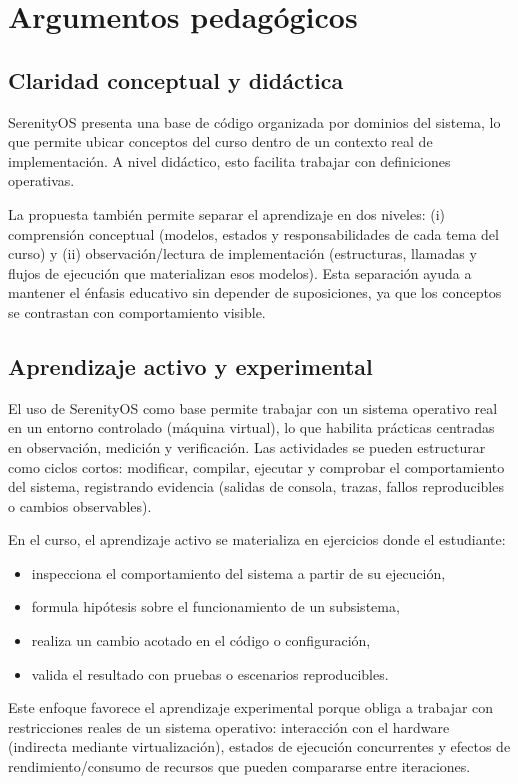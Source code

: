\section{Argumentos pedagógicos}
\subsection{Claridad conceptual y didáctica}
SerenityOS presenta una base de código organizada por dominios del sistema, lo que permite ubicar conceptos del curso dentro de un contexto real de implementación. A nivel didáctico, esto facilita trabajar con definiciones operativas.

La propuesta también permite separar el aprendizaje en dos niveles: (i) comprensión conceptual (modelos, estados y responsabilidades de cada tema del curso) y (ii) observación/lectura de implementación (estructuras, llamadas y flujos de ejecución que materializan esos modelos). Esta separación ayuda a mantener el énfasis educativo sin depender de suposiciones, ya que los conceptos se contrastan con comportamiento visible.
\subsection{Aprendizaje activo y experimental}
El uso de SerenityOS como base permite trabajar con un sistema operativo real en un entorno controlado (máquina virtual), lo que habilita prácticas centradas en observación, medición y verificación. Las actividades se pueden estructurar como ciclos cortos: modificar, compilar, ejecutar y comprobar el comportamiento del sistema, registrando evidencia (salidas de consola, trazas, fallos reproducibles o cambios observables).

En el curso, el aprendizaje activo se materializa en ejercicios donde el estudiante:
\begin{itemize}
	\item inspecciona el comportamiento del sistema a partir de su ejecución,
	\item formula hipótesis sobre el funcionamiento de un subsistema,
	\item realiza un cambio acotado en el código o configuración,
	\item valida el resultado con pruebas o escenarios reproducibles.
\end{itemize}

Este enfoque favorece el aprendizaje experimental porque obliga a trabajar con restricciones reales de un sistema operativo: interacción con el hardware (indirecta mediante virtualización), estados de ejecución concurrentes y efectos de rendimiento/consumo de recursos que pueden compararse entre iteraciones.


